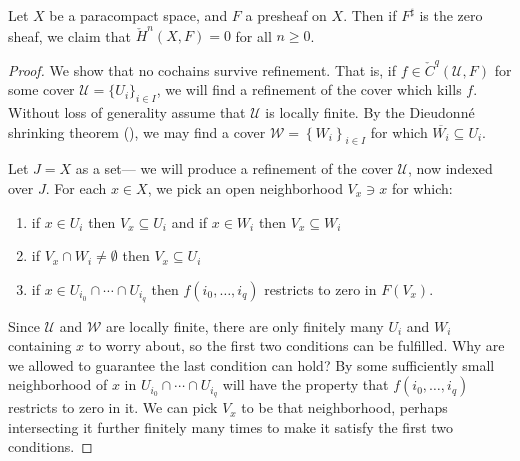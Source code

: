 \documentclass[11pt]{amsart}
\begin{document}
\begin{lemma}\label{lem:presheaf-sheafifying-to-zero-has-no-cohomology} 
Let $X$ be a paracompact space, and $F$ a presheaf on $X$. Then if $F^\sharp$ is the zero sheaf, we claim that $\check{H}^n(X,F) = 0$ for all $n\ge0$.
\end{lemma}
\begin{proof} We show that no cochains survive refinement. That is, if $f \in \check{C}^q(\mathcal{U},F)$ for some cover $\mathcal{U} = \{U_i\}_{i\in I}$, we will find a refinement of the cover which kills $f$. Without loss of generality assume that $\mathcal{U}$ is locally finite. By the Dieudonn\'e shrinking theorem (), we may find a cover $\mathcal{W} = \left\{ W_i \right\}_{i\in I}$ for which $\overline{W_i} \subseteq U_i$.

Let $J = X$ as a set--- we will produce a refinement of the cover $\mathcal{U}$, now indexed over $J$. For each $x\in X$, we pick an open neighborhood $V_x \ni x$ for which:
\begin{enumerate}
    \item if $x\in U_i$ then $V_x \subseteq U_i$ and if $x\in W_i$ then $V_x \subseteq W_i$
    \item if $V_x \cap W_i \ne \emptyset$ then $V_x \subseteq U_i$
    \item if $x\in U_{i_0} \cap \cdots \cap U_{i_q}$ then $f(i_0, \ldots, i_q)$ restricts to zero in $F(V_x)$.
\end{enumerate}
Since $\mathcal{U}$ and $\mathcal{W}$ are locally finite, there are only finitely many $U_i$ and $W_i$ containing $x$ to worry about, so the first two conditions can be fulfilled. Why are we allowed to guarantee the last condition can hold? By  some sufficiently small neighborhood of $x$ in $U_{i_0} \cap \cdots \cap U_{i_q}$ will have the property that $f(i_0, \ldots, i_q)$ restricts to zero in it. We can pick $V_x$ to be that neighborhood, perhaps intersecting it further finitely many times to make it satisfy the first two conditions.


\end{proof}
\end{document}
